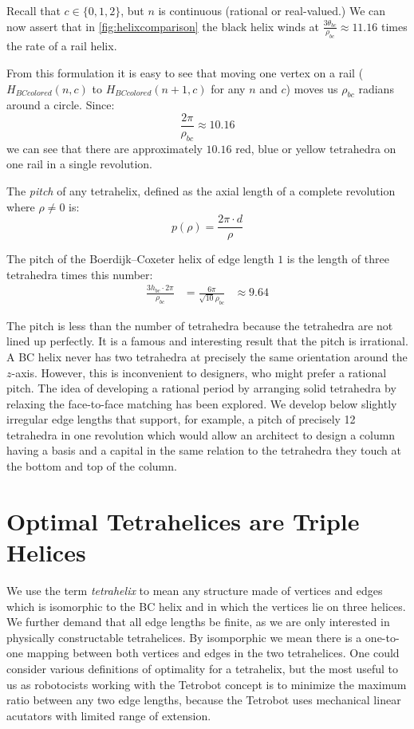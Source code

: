 \documentclass[review]{siamonline1116}
\begin{document}
Recall that $c \in \{0,1,2\}$, but $n$ is continuous (rational or real-valued.)
We can now assert that in \cref{fig:helixcomparison} the black helix winds at
$\frac{3 \theta_{bc}}{\rho_{bc}} \approx 11.16 $ times the rate of a rail helix.

From this formulation it is easy to see that moving one vertex on a rail
($H_{BCcolored}(n,c)$ to $H_{BCcolored}(n+1,c)$ for any $n$ and $c$)
moves us $\rho_{bc}$ radians around a circle. Since:
\[ \frac{2 \pi}{\rho_{bc}} \approx 10.16
\]
we can see that there are approximately $10.16$ red, blue or yellow tetrahedra on one rail in a single revolution.

The \emph{pitch} of any tetrahelix, defined as the axial length of a complete revolution
where $\rho \neq 0$ is:
\begin{equation}
  \label{pitcheqn}
p(\rho) = \frac{2 \pi  \cdot d}{\rho}
\end{equation}

The pitch of the Boerdijk--Coxeter helix of edge length $1$ is the length of three tetrahedra times this number:
\begin{align*}
   \frac{3 h_{bc}\cdot  2 \pi }{\rho_{bc}} 
  &= \frac{6 \pi}{\sqrt{10}\rho_{bc}} 
  &\approx 9.64 
\end{align*}


The pitch is less than the number of tetrahedra because the tetrahedra
are not lined up perfectly.  It is a famous and interesting result
that the pitch is irrational. A BC helix never has two tetrahedra at
precisely the same orientation around the $z$-axis. However, this is
inconvenient to designers, who might prefer a rational pitch.
The idea of developing a rational period by arranging solid tetrahedra by relaxing the face-to-face matching
has been explored\cite{sadler2013periodic}. 
We develop below slightly irregular edge lengths that support, for example, a pitch of precisely 12
tetrahedra in one revolution which would allow an architect to design a
column having a basis and a capital in the same relation to the
tetrahedra they touch at the bottom and top of the column.


\section{Optimal Tetrahelices are Triple Helices}

We use the term \emph{tetrahelix} to mean any structure made of
vertices and edges which is isomorphic to the BC helix and in which the
vertices lie on three helices. We further demand that all edge lengths
be finite, as we are only interested in physically constructable tetrahelices.
By isomporphic we mean there is a one-to-one mapping between both
vertices and edges in the two tetrahelices.
One could consider various definitions of optimality for a
tetrahelix, but the most useful to us as robotocists working with the Tetrobot
concept is to minimize the
maximum ratio between any two edge lengths, because the Tetrobot uses
mechanical linear acutators with
limited range of extension.
\end{document}
